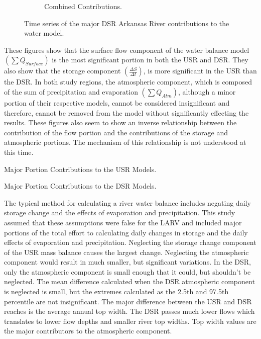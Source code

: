 \begin{linenumbers}
\begin{figure}[htbp]
\begin{subfigure}{0.5\textwidth}
		\caption{Combined Contributions.}
	\end{subfigure}
	\caption[Time series of the major DSR Arkansas River contributions to the water model.]{Time series of the major DSR Arkansas River contributions to the water model.}
	\label{fig:DSRWaterContrib}
\end{figure}

These figures show that the surface flow component of the water balance model $ \displaystyle \left( \sum Q_{Surface} \right) $ is the most significant portion in both the USR and DSR.  They also show that the storage component $ \displaystyle \left( \frac{\Delta S}{\Delta t} \right) $, is more significant in the USR than the DSR.  In both study regions, the atmospheric component, which is composed of the sum of precipitation and evaporation $ \displaystyle \left( \sum Q_{Atm} \right) $, although a minor portion of their respective models, cannot be considered insignificant and therefore, cannot be removed from the model without significantly effecting the results.  These figures also seem to show an inverse relationship between the contribution of the flow portion and the contributions of the storage and atmospheric portions.  The mechanism of this relationship is not understood at this time.

\begin{table}[htbp]
	\centering
	\caption[Major Portion Contributions to the USR Models.]{Major Portion Contributions to the USR Models.}
	\label{tab:USRContrib}
	
\end{table}
\tablevspace
\begin{table}[htbp]
	\centering
	\caption[Major Portion Contributions to the DSR Models.]{Major Portion Contributions to the DSR Models.}
	\label{tab:DSRContrib}
	
\end{table}

The typical method for calculating a river water balance includes negating daily storage change and the effects of evaporation and precipitation.  This study assumed that these assumptions were false for the LARV and included major portions of the total effort to calculating daily changes in storage and the daily effects of evaporation and precipitation.  Neglecting the storage change component of the USR mass balance causes the largest change.  Neglecting the atmospheric component would result in much smaller, but significant variations.  In the DSR, only the atmospheric component is small enough that it could, but shouldn't be neglected.  The mean difference calculated when the DSR atmospheric component is neglected is small, but the extremes calculated as the 2.5th and 97.5th percentile are not insignificant.  The major difference between the USR and DSR reaches is the average annual top width.  The DSR passes much lower flows which translates to lower flow depths and smaller river top widths.  Top width values are the major contributors to the atmospheric component.


\end{linenumbers}
